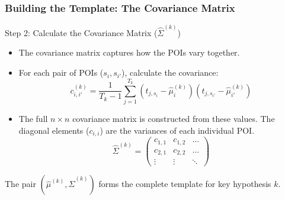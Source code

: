 \begin{frame}
    \frametitle{Building the Template: The Covariance Matrix}

    \begin{block}{Step 2: Calculate the Covariance Matrix ($\hat{\Sigma}^{(k)}$)}
        \begin{itemize}
            \item The covariance matrix captures how the POIs vary together.
            \item For each pair of POIs ($s_i, s_{i'}$), calculate the covariance:
            \[ c_{i, i'}^{(k)} = \frac{1}{T_k-1} \sum_{j=1}^{T_k} (t_{j, s_i} - \hat{\mu}_i^{(k)})(t_{j, s_{i'}} - \hat{\mu}_{i'}^{(k)}) \]
            \item The full $n \times n$ covariance matrix is constructed from these values. The diagonal elements ($c_{i,i}$) are the variances of each individual POI.
            \[ \hat{\Sigma}^{(k)} = \begin{pmatrix} c_{1,1} & c_{1,2} & \dots \\ c_{2,1} & c_{2,2} & \dots \\ \vdots & \vdots & \ddots \end{pmatrix} \]
        \end{itemize}
    \end{block}
    
    The pair $(\hat{\mu}^{(k)}, \hat{\Sigma}^{(k)})$ forms the complete template for key hypothesis $k$.
    
\end{frame}





